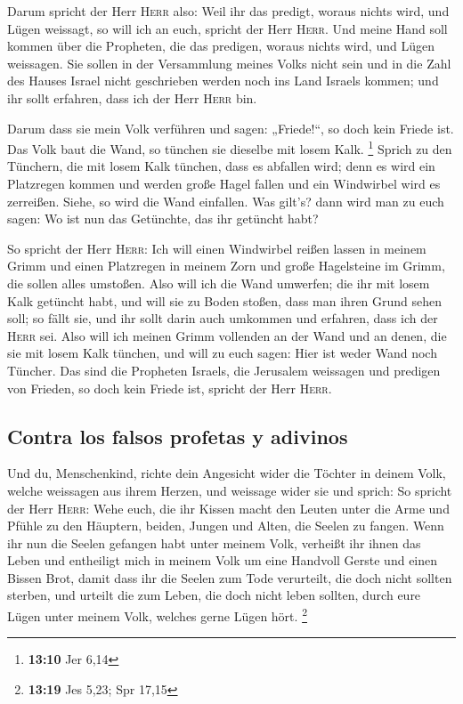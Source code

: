  Darum spricht der Herr \textsc{Herr} also: Weil ihr das
predigt, woraus nichts wird, und Lügen weissagt, so will ich an euch,
spricht der Herr \textsc{Herr}.  Und meine Hand soll
kommen über die Propheten, die das predigen, woraus nichts wird, und
Lügen weissagen. Sie sollen in der Versammlung meines Volks nicht sein
und in die Zahl des Hauses Israel nicht geschrieben werden noch ins Land
Israels kommen; und ihr sollt erfahren, dass ich der Herr \textsc{Herr}
bin.

 Darum dass sie mein Volk verführen und sagen:
„Friede!{}``, so doch kein Friede ist. Das Volk baut die Wand, so
tünchen sie dieselbe mit losem Kalk. \footnote{\textbf{13:10} Jer 6,14}
 Sprich zu den Tünchern, die mit losem Kalk tünchen, dass
es abfallen wird; denn es wird ein Platzregen kommen und werden große
Hagel fallen und ein Windwirbel wird es zerreißen. 
Siehe, so wird die Wand einfallen. Was gilt's? dann wird man zu euch
sagen: Wo ist nun das Getünchte, das ihr getüncht habt?

 So spricht der Herr \textsc{Herr}: Ich will einen
Windwirbel reißen lassen in meinem Grimm und einen Platzregen in meinem
Zorn und große Hagelsteine im Grimm, die sollen alles umstoßen.
 Also will ich die Wand umwerfen; die ihr mit losem Kalk
getüncht habt, und will sie zu Boden stoßen, dass man ihren Grund sehen
soll; so fällt sie, und ihr sollt darin auch umkommen und erfahren, dass
ich der \textsc{Herr} sei.  Also will ich meinen Grimm
vollenden an der Wand und an denen, die sie mit losem Kalk tünchen, und
will zu euch sagen: Hier ist weder Wand noch Tüncher. 
Das sind die Propheten Israels, die Jerusalem weissagen und predigen von
Frieden, so doch kein Friede ist, spricht der Herr \textsc{Herr}.

\hypertarget{contra-los-falsos-profetas-y-adivinos}{%
\subsection{Contra los falsos profetas y
adivinos}\label{contra-los-falsos-profetas-y-adivinos}}

 Und du, Menschenkind, richte dein Angesicht wider die
Töchter in deinem Volk, welche weissagen aus ihrem Herzen, und weissage
wider sie  und sprich: So spricht der Herr \textsc{Herr}:
Wehe euch, die ihr Kissen macht den Leuten unter die Arme und Pfühle zu
den Häuptern, beiden, Jungen und Alten, die Seelen zu fangen. Wenn ihr
nun die Seelen gefangen habt unter meinem Volk, verheißt ihr ihnen das
Leben  und entheiligt mich in meinem Volk um eine
Handvoll Gerste und einen Bissen Brot, damit dass ihr die Seelen zum
Tode verurteilt, die doch nicht sollten sterben, und urteilt die zum
Leben, die doch nicht leben sollten, durch eure Lügen unter meinem Volk,
welches gerne Lügen hört. \footnote{\textbf{13:19} Jes 5,23; Spr 17,15}

